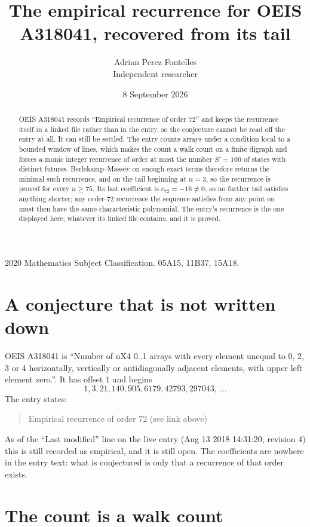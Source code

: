 \documentclass[11pt,a4paper]{article}
\title{The empirical recurrence for OEIS A318041, recovered from its tail}
\author{Adrian Perez Fontelles\\ \small Independent researcher}
\date{8 September 2026}
\theoremstyle{plain}
\theoremstyle{definition}
\begin{document}
\maketitle

\begin{abstract}
OEIS A318041 records ``Empirical recurrence of order $72$'' and keeps the recurrence itself in
a linked file rather than in the entry, so the conjecture cannot be read off the entry at all.
It can still be settled. The entry counts arrays under a condition local to a bounded window of
lines, which makes the count a walk count on a finite digraph and forces a monic integer
recurrence of order at most the number $S'=100$ of states with distinct futures. Berlekamp--Massey on
enough exact terms therefore returns the minimal such recurrence, and on the tail beginning at $n=3$, so the recurrence is proved for every $n\ge75$.
Its last coefficient is $c_{72}=-16\neq0$, so no further tail satisfies anything
shorter; any order-$72$ recurrence the sequence satisfies from any point on must then have
the same characteristic polynomial. The entry's recurrence is the one displayed here, whatever
its linked file contains, and it is proved.
\end{abstract}

\noindent\small 2020 Mathematics Subject Classification. 05A15, 11B37, 15A18.\normalsize

\section{A conjecture that is not written down}

OEIS A318041 is ``Number of nX4 0..1 arrays with every element unequal to 0, 2, 3 or 4 horizontally, vertically or antidiagonally adjacent elements, with upper left element zero.''. It has offset $1$ and begins
\[
1, 3, 21, 140, 905, 6179, 42793, 297043,\ \dots
\]
The entry states:
\begin{quote}
Empirical recurrence of order 72 (see link above)
\end{quote}
As of the ``Last modified'' line on the live entry (Aug 13 2018 14:31:20, revision 4)
this is still recorded as empirical, and it is still open. The coefficients are nowhere in the
entry text: what is conjectured is only that a recurrence of that order exists.

\section{The count is a walk count}
\end{document}
